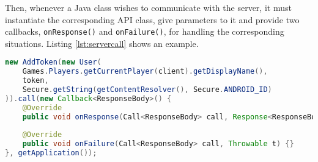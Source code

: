 Then, whenever a Java class wishes to communicate with the server, it must 
instantiate the corresponding API class, give parameters to it and provide
two callbacks, \texttt{onResponse()} and \texttt{onFailure()}, for handling the
corresponding situations. Listing \ref{lst:servercall} shows an example.

\begin{lstlisting}[language=Java, caption={Server call example}, label={lst:servercall}]
new AddToken(new User(
	Games.Players.getCurrentPlayer(client).getDisplayName(),
	token,
	Secure.getString(getContentResolver(), Secure.ANDROID_ID)
)).call(new Callback<ResponseBody>() {
	@Override
	public void onResponse(Call<ResponseBody> call, Response<ResponseBody> response) {}
	
	@Override
	public void onFailure(Call<ResponseBody> call, Throwable t) {}
}, getApplication());
\end{lstlisting}
